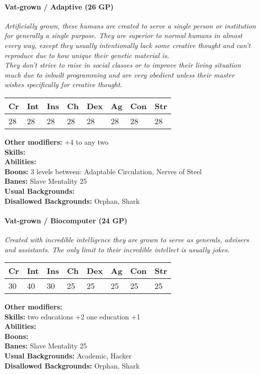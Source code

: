 \documentclass[12pt,a4paper,openany]{book}
\begin{document}
	\hrulefill
	\paragraph*{Vat-grown / Adaptive (26 GP)}
	\textit{Artificially grown, these humans are created to serve a single person or institution for generally a single purpose. They are superior to normal humans in almost every way, except they usually intentionally lack some creative thought and can't reproduce due to how unique their genetic material is.\\
	They don't strive to raise in social classes or to improve their living situation much due to inbuilt programming and are very obedient unless their master wishes specifically for creative thought.}\par
	\begin{tabular}{|l|l|l|l|l|l|l|l|}
		\hline
		Cr & Int & Ins & Ch & Dex & Ag & Con & Str \\ \hline
		28 & 28 & 28 & 28 & 28 & 28 & 28 & 28 \\ \hline
	\end{tabular}\par
	\noindent\textbf{Other modifiers:} +4 to any two\\
	\textbf{Skills:} \\
	\textbf{Abilities:} \\
	\textbf{Boons:} 3 levels between: Adaptable Circulation, Nerves of Steel\\
	\textbf{Banes:} Slave Mentality 25\\
	\textbf{Usual Backgrounds:} \\
	\textbf{Disallowed Backgrounds:} Orphan, Shark
	
	\hrulefill
	\paragraph*{Vat-grown / Biocomputer (24 GP)}
	\textit{Created with incredible intelligence they are grown to serve as generals, advisers and assistants. The only limit to their incredible intellect is usually jokes.}\par
	\begin{tabular}{|l|l|l|l|l|l|l|l|}
		\hline
		Cr & Int & Ins & Ch & Dex & Ag & Con & Str \\ \hline
		30 & 40 & 30 & 25 & 25 & 25 & 25 & 25 \\ \hline
	\end{tabular}\par
	\noindent\textbf{Other modifiers:} \\
	\textbf{Skills:} two educations +2
	one education +1\\
	\textbf{Abilities:} \\
	\textbf{Boons:} \\
	\textbf{Banes:} Slave Mentality 25\\
	\textbf{Usual Backgrounds:} Academic, Hacker\\
	\textbf{Disallowed Backgrounds:} Orphan, Shark
	
\end{document}
